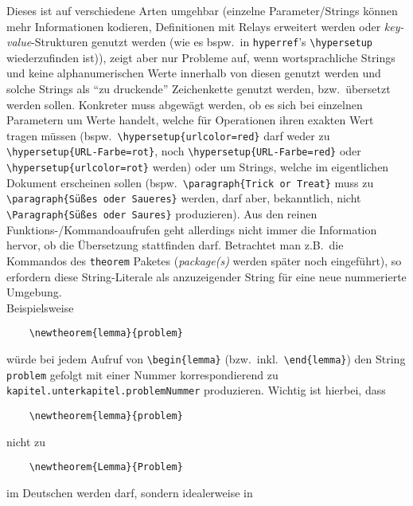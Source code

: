 Dieses ist auf verschiedene Arten umgehbar (einzelne Parameter/Strings können mehr Informationen kodieren, Definitionen mit Relays erweitert werden oder \textit{key-value}-Strukturen genutzt werden (wie es bspw.\ in \texttt{hyperref}'s \verb|\hypersetup| wiederzufinden ist)), zeigt aber nur Probleme auf, wenn wortsprachliche Strings und keine alphanumerischen Werte innerhalb von diesen genutzt werden und solche Strings als \enquote{zu druckende} Zeichenkette genutzt werden, bzw.\ übersetzt werden sollen. %
Konkreter muss abgewägt werden, ob es sich bei einzelnen Parametern um Werte handelt, welche für Operationen ihren exakten Wert tragen müssen (bspw.\ \verb"\hypersetup{urlcolor=red}" darf weder zu \verb"\hypersetup{URL-Farbe=rot}", noch \verb"\hypersetup{URL-Farbe=red}" oder \verb"\hypersetup{urlcolor=rot}" werden) oder um Strings, welche im eigentlichen Dokument erscheinen sollen (bspw.\ \verb"\paragraph{Trick or Treat}" muss zu \verb"\paragraph{Süßes oder Saueres}" werden, darf aber, bekanntlich, nicht \verb"\Paragraph{Süßes oder Saures}" produzieren). 
Aus den reinen Funktions-/Kommandoaufrufen geht allerdings nicht immer die Information hervor, ob die Übersetzung stattfinden darf. Betrachtet man z.B.\ die Kommandos des \texttt{theorem} Paketes (\textit{package(s)} werden später noch eingeführt), so erfordern diese String-Literale als anzuzeigender String für eine neue nummerierte Umgebung.\\
Beispielsweise
\begin{Verbatim}
    \newtheorem{lemma}{problem}
\end{Verbatim}
würde bei jedem Aufruf von \verb"\begin{lemma}" (bzw.\ inkl.\ \verb|\end{lemma}|) den String \verb"problem" gefolgt mit einer Nummer korrespondierend zu \texttt{kapitel.unterkapitel.problemNummer} produzieren. Wichtig ist hierbei, dass 
\begin{Verbatim}
    \newtheorem{lemma}{problem}
\end{Verbatim}
nicht zu 
\begin{Verbatim}
    \newtheorem{Lemma}{Problem}
\end{Verbatim}
im Deutschen werden darf, sondern idealerweise in 
